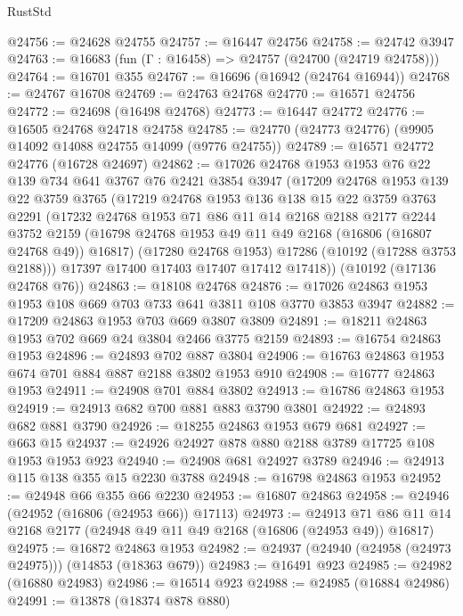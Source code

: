 \begin{lexlean}{RustStd}
\begin{coremodule}
@24756 := @24628 @24755
@24757 := @16447 @24756
@24758 := @24742 @3947
@24763 := @16683 (fun (Γ : @16458) => @24757 (@24700 (@24719 @24758)))
@24764 := @16701 @355
@24767 := @16696 (@16942 (@24764 @16944))
@24768 := @24767 @16708
@24769 := @24763 @24768
@24770 := @16571 @24756
@24772 := @24698 (@16498 @24768)
@24773 := @16447 @24772
@24776 := @16505 @24768 @24718 @24758
@24785 := @24770 (@24773 @24776) (@9905 @14092 @14088 @24755 @14099 (@9776 @24755))
@24789 := @16571 @24772 @24776 (@16728 @24697)
@24862 := @17026
    @24768
    @1953
    @1953
    @76
    @22
    @139
    @734
    @641
    @3767
    @76
    @2421
    @3854
    @3947
    (@17209
      @24768
      @1953
      @139
      @22
      @3759
      @3765
      (@17219
        @24768
        @1953
        @136
        @138
        @15
        @22
        @3759
        @3763
        @2291
        (@17232
          @24768
          @1953
          @71
          @86
          @11
          @14
          @2168
          @2188
          @2177
          @2244
          @3752
          @2159
          (@16798 @24768 @1953 @49 @11 @49 @2168 (@16806 (@16807 @24768 @49)) @16817)
          (@17280 @24768 @1953)
          @17286
          (@10192 (@17288 @3753 @2188)))
        @17397
        @17400
        @17403
        @17407
        @17412
        @17418))
    (@10192 (@17136 @24768 @76))
@24863 := @18108 @24768
@24876 := @17026 @24863 @1953 @1953 @108 @669 @703 @733 @641 @3811 @108 @3770 @3853 @3947
@24882 := @17209 @24863 @1953 @703 @669 @3807 @3809
@24891 := @18211 @24863 @1953 @702 @669 @24 @3804 @2466 @3775 @2159
@24893 := @16754 @24863 @1953
@24896 := @24893 @702 @887 @3804
@24906 := @16763 @24863 @1953 @674 @701 @884 @887 @2188 @3802 @1953 @910
@24908 := @16777 @24863 @1953
@24911 := @24908 @701 @884 @3802
@24913 := @16786 @24863 @1953
@24919 := @24913 @682 @700 @881 @883 @3790 @3801
@24922 := @24893 @682 @881 @3790
@24926 := @18255 @24863 @1953 @679 @681
@24927 := @663 @15
@24937 := @24926 @24927 @878 @880 @2188 @3789 @17725 @108 @1953 @1953 @923
@24940 := @24908 @681 @24927 @3789
@24946 := @24913 @115 @138 @355 @15 @2230 @3788
@24948 := @16798 @24863 @1953
@24952 := @24948 @66 @355 @66 @2230
@24953 := @16807 @24863
@24958 := @24946 (@24952 (@16806 (@24953 @66)) @17113)
@24973 := @24913 @71 @86 @11 @14 @2168 @2177 (@24948 @49 @11 @49 @2168 (@16806 (@24953 @49)) @16817)
@24975 := @16872 @24863 @1953
@24982 := @24937 (@24940 (@24958 (@24973 @24975))) (@14853 (@18363 @679))
@24983 := @16491 @923
@24985 := @24982 (@16880 @24983)
@24986 := @16514 @923
@24988 := @24985 (@16884 @24986)
@24991 := @13878 (@18374 @878 @880)

\end{coremodule}
\end{lexlean}
